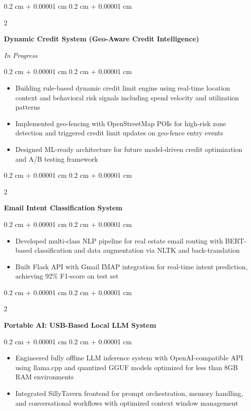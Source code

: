 \documentclass[10pt, letterpaper]{article}
\newenvironment{highlights}{
    \begin{itemize}[
        topsep=0.10 cm,
        parsep=0.10 cm,
        partopsep=0pt,
        itemsep=0pt,
        leftmargin=0.4 cm + 10pt
    ]
}{
    \end{itemize}
}
\newenvironment{onecolentry}{
    \begin{adjustwidth}{
        0.2 cm + 0.00001 cm
    }{
        0.2 cm + 0.00001 cm
    }
}{
    \end{adjustwidth}
}
\newenvironment{twocolentry}[2][]{
    \onecolentry
    \def\secondColumn{#2}
    \setcolumnwidth{\fill, 4.5 cm}
    \begin{paracol}{2}
}{
    \switchcolumn \raggedleft \secondColumn
    \end{paracol}
    \endonecolentry
}
\let\hrefWithoutArrow\href
\renewcommand{\href}[2]{\hrefWithoutArrow{#1}{\ifthenelse{\equal{#2}{}}{ }{#2 }\raisebox{.15ex}{\footnotesize \faExternalLink*}}}
\begin{document}
        \begin{twocolentry}{\textit{In Progress}}
            \textbf{Dynamic Credit System (Geo-Aware Credit Intelligence)}
        \end{twocolentry}
        \vspace{0.05 cm}
        \begin{onecolentry}
            \begin{highlights}
                \item Building rule-based dynamic credit limit engine using real-time location context and behavioral risk signals including spend velocity and utilization patterns
                \item Implemented geo-fencing with OpenStreetMap POIs for high-risk zone detection and triggered credit limit updates on geo-fence entry events
                \item Designed ML-ready architecture for future model-driven credit optimization and A/B testing framework
            \end{highlights}
        \end{onecolentry}

        \begin{twocolentry}{\textit{\href{https://github.com/zardat/Email-Intent-Classification-}{GitHub}}}
            \textbf{Email Intent Classification System}
        \end{twocolentry}
        \vspace{0.05 cm}
        \begin{onecolentry}
            \begin{highlights}
                \item Developed multi-class NLP pipeline for real estate email routing with BERT-based classification and data augmentation via NLTK and back-translation
                \item Built Flask API with Gmail IMAP integration for real-time intent prediction, achieving 92\% F1-score on test set
            \end{highlights}
        \end{onecolentry}

        \vspace{0.1 cm}

        \begin{twocolentry}{}
            \textbf{Portable AI: USB-Based Local LLM System}
        \end{twocolentry}
        \vspace{0.05 cm}
        \begin{onecolentry}
            \begin{highlights}
                \item Engineered fully offline LLM inference system with OpenAI-compatible API using llama.cpp and quantized GGUF models optimized for less than 8GB RAM environments
                \item Integrated SillyTavern frontend for prompt orchestration, memory handling, and conversational workflows with optimized context window management
            \end{highlights}
        \end{onecolentry}
\end{document}
